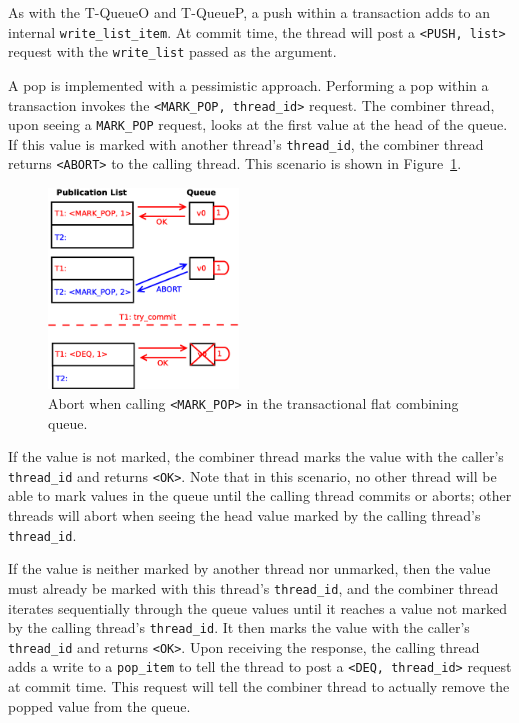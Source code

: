 As with the T-QueueO and T-QueueP, a push within a transaction adds to an internal \texttt{write\_list\_item}. At commit time, the thread will post a \texttt{<PUSH, list>} request with the \texttt{write\_list} passed as the argument.

A pop is implemented with a pessimistic approach. Performing a pop within a transaction invokes the \texttt{<MARK\_POP, thread\_id>} request. The combiner thread, upon seeing a \texttt{MARK\_POP} request, looks at the first value at the head of the queue. If this value is marked with another thread's \texttt{thread\_id}, the combiner thread returns \texttt{<ABORT>} to the calling thread. This scenario is shown in Figure~\ref{fig:fcqueue_abort1}.

\begin{figure}[t]
\centering
\includegraphics[width=0.45\textwidth]{fcqueue_abort1}
    \caption{Abort when calling \texttt{<MARK\_POP>} in the transactional flat combining queue.}
\label{fig:fcqueue_abort1}
\end{figure}

If the value is not marked, the combiner thread marks the value with the caller's \texttt{thread\_id} and returns \texttt{<OK>}. Note that in this scenario, no other thread will be able to mark values in the queue until the calling thread commits or aborts; other threads will abort when seeing the head value marked by the calling thread's \texttt{thread\_id}. 

If the value is neither marked by another thread nor unmarked, then the value must already be marked with this thread's \texttt{thread\_id}, and the combiner thread iterates sequentially through the queue values until it reaches a value not marked by the calling thread's \texttt{thread\_id}. It then marks the value with the caller's \texttt{thread\_id} and returns \texttt{<OK>}. Upon receiving the response, the calling thread adds a write to a \texttt{pop\_item} to tell the thread to post a \texttt{<DEQ, thread\_id>} request at commit time. This request will tell the combiner thread to actually remove the popped value from the queue.

